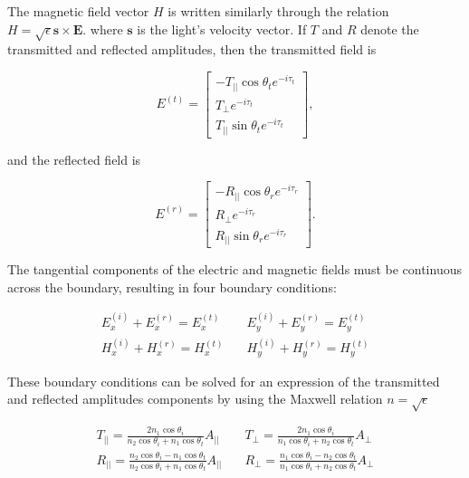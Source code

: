 The magnetic field vector $H$ is written similarly through the relation $H = \sqrt{\epsilon} \mathbf{s} \times \mathbf{E}$.
where $\mathbf{s}$ is the light's velocity vector. If $T$ and $R$ denote the transmitted and reflected amplitudes, then the transmitted field is

\begin{equation}
    E^{(t)} = 
    \begin{bmatrix}
        -T_{||} \cos{\theta_t} e^{-i \tau_t} \\
        T_\perp e^{-i \tau_t} \\
        T_{||} \sin{\theta_t} e^{-i \tau_t}
    \end{bmatrix},
\end{equation}

and the reflected field is

\begin{equation}
    E^{(r)} = 
    \begin{bmatrix}
        -R_{||} \cos{\theta_r} e^{-i \tau_r} \\
        R_\perp e^{-i \tau_r} \\
        R_{||} \sin{\theta_r} e^{-i \tau_r}
    \end{bmatrix}.
\end{equation}

The tangential components of the electric and magnetic fields must be continuous across the boundary, resulting in four boundary conditions:

\begin{align}
    E^{(i)}_x + E^{(r)}_x = E^{(t)}_x \quad & E^{(i)}_y + E^{(r)}_y = E^{(t)}_y \\
    H^{(i)}_x + H^{(r)}_x = H^{(t)}_x \quad & H^{(i)}_y + H^{(r)}_y = H^{(t)}_y
\end{align}

These boundary conditions can be solved for an expression of the transmitted and reflected amplitudes components by using the Maxwell relation $n = \sqrt{\epsilon}$

\begin{align}
    T_{||} = \frac{2 n_1 \cos{\theta_i}}{n_2 \cos{\theta_i} + n_1 \cos{\theta_t}} A_{||} \quad &
    T_{\perp} = \frac{2 n_1 \cos{\theta_i}}{n_1 \cos{\theta_i} + n_2 \cos{\theta_t}} A_{\perp} \\
    R_{||} = \frac{n_2 \cos{\theta_i} - n_1 \cos{\theta_t}}{n_2 \cos{\theta_i} + n_1 \cos{\theta_t}} A_{||} \quad &
    R_{\perp} = \frac{n_1 \cos{\theta_i} - n_2 \cos{\theta_t}}{n_1 \cos{\theta_i} + n_2 \cos{\theta_t}} A_{\perp}
\end{align}

